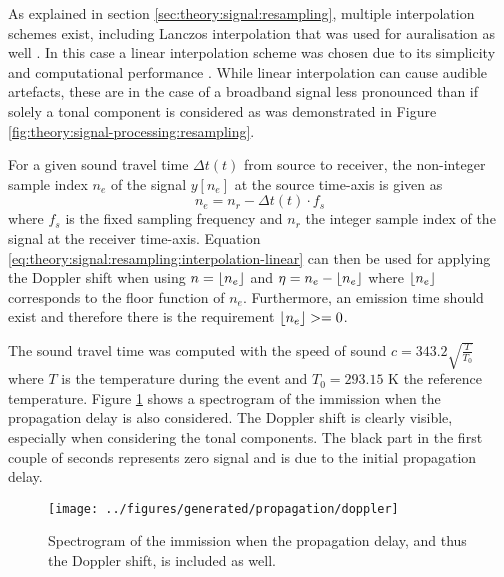 As explained in section \ref{sec:theory:signal:resampling}, multiple
interpolation schemes exist, including Lanczos interpolation that was used for
auralisation as well \cite{Rietdijk2015, Pieren2015}. In this case a linear
interpolation scheme was chosen due to its simplicity and computational
performance \cite{Heutschi2014}. While linear interpolation can cause audible
artefacts, these are in the case of a broadband signal less pronounced than if
solely a tonal component is considered as was demonstrated in Figure
\ref{fig:theory:signal-processing:resampling}.

For a given sound travel time $\Delta t(t)$ from source to receiver, the non-integer sample index
$n_{e}$ of the signal $y[n_e]$ at the source time-axis is given as
\begin{equation}
 n_{e} = n_r - \Delta t (t) \cdot f_s
\end{equation}
where $f_s$ is the fixed sampling frequency and $n_r$ the integer sample index
of the signal at the receiver time-axis. Equation
\eqref{eq:theory:signal:resampling:interpolation-linear} can then be used for
applying the Doppler shift when using $n=\lfloor n_e\rfloor$ and $\eta = n_e - \lfloor n_e\rfloor$
where $\lfloor n_e\rfloor$ corresponds to the floor function of $n_e$.
Furthermore, an emission time should exist and therefore there is the
requirement $\lfloor n_e\rfloor >= 0$.

The sound travel time was computed with the speed of sound $c =
343.2 \sqrt{ \frac{T}{T_0} }$ where $T$ is the temperature during the event and
$T_0 = 293.15$ K the reference temperature.
Figure \ref{fig:implementation:propagation:doppler} shows a spectrogram of the
immission when the propagation delay is also considered. The Doppler shift is
clearly visible, especially when considering the tonal components.
The black part in the first couple of seconds represents zero signal and is due to the initial propagation delay.

\begin{figure}[H]
  \centering
  \texttt{[image: ../figures/generated/propagation/doppler]}
  \caption{Spectrogram of the immission when the propagation delay, and thus the Doppler shift, is included as well. }
  \label{fig:implementation:propagation:doppler}
\end{figure}

